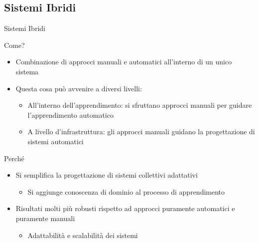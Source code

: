 \documentclass[presentation, 10pt,aspectratio=169]{beamer}\mode<presentation>{\usetheme{AMSBolognaFC}}
\begin{document}
	\subsection{Sistemi Ibridi}
\begin{frame}{Sistemi Ibridi}
	\begin{exampleblock}{Come?}
		\begin{itemize}
			\item Combinazione di approcci manuali e automatici all'interno di un unico sistema
			\item Questa cosa può avvenire a diversi livelli:
			\begin{itemize}
				\item All'interno dell'apprendimento: si sfruttano approcci manuali per guidare l'apprendimento automatico
				\item A livello d'infrastruttura: gli approcci manuali guidano la progettazione di sistemi automatici
			\end{itemize}
		\end{itemize}
	\end{exampleblock}
	\begin{alertblock}{Perché}
		\begin{itemize}
			\item Si semplifica la progettazione di sistemi collettivi adattativi
			\begin{itemize}
				\item Si aggiunge conoscenza di dominio al processo di apprendimento
			\end{itemize}

			\item Risultati molti più robusti rispetto ad approcci puramente automatici e puramente manuali
			\begin{itemize}
				\item Adattabilità e scalabilità dei sistemi
			\end{itemize}
		\end{itemize}
	\end{alertblock}
\end{frame}
\end{document}
